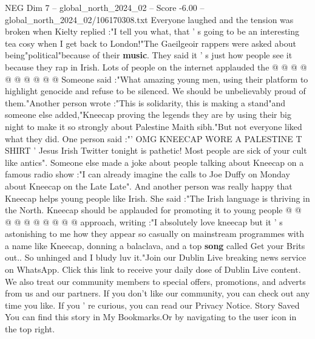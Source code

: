 \begin{textsample}{NEG Dim 7 – global\_north\_2024\_02 – Score -6.00 – global\_north\_2024\_02/106170308.txt}
Everyone laughed and the tension was broken when Kielty replied :"I tell you what, that ' s going to be an interesting tea cosy when I get back to London!"The Gaeilgeoir rappers were asked about being"political"because of their \textbf{music}.
They said it ' s just how people see it because they rap in Irish.
Lots of people on the internet applauded the @ @ @ @ @ @ @ @ @ @ Someone said :"What amazing young men, using their platform to highlight genocide and refuse to be silenced.
We should be unbelievably proud of them."Another person wrote :"This is solidarity, this is making a stand"and someone else added,"Kneecap proving the legends they are by using their big night to make it so strongly about Palestine Maith sibh."But not everyone liked what they did.
One person said :"' OMG KNEECAP WORE A PALESTINE T SHIRT ' Jesus Irish Twitter tonight is pathetic!
Most people are sick of your cult like antics".
Someone else made a joke about people talking about Kneecap on a famous radio show :"I can already imagine the calls to Joe Duffy on Monday about Kneecap on the Late Late".
And another person was really happy that Kneecap helps young people like Irish.
She said :"The Irish language is thriving in the North.
Kneecap should be applauded for promoting it to young people @ @ @ @ @ @ @ @ @ @ approach, writing :"I absolutely love kneecap but it ' s astonishing to me how they appear so casually on mainstream programmes with a name like Kneecap, donning a balaclava, and a top \textbf{song} called Get your Brits out..
So unhinged and I bludy luv it."Join our Dublin Live breaking news service on WhatsApp.
Click this link to receive your daily dose of Dublin Live content.
We also treat our community members to special offers, promotions, and adverts from us and our partners.
If you don't like our community, you can check out any time you like.
If you ' re curious, you can read our Privacy Notice.
Story Saved You can find this story in My Bookmarks.Or by navigating to the user icon in the top right.

\end{textsample}
